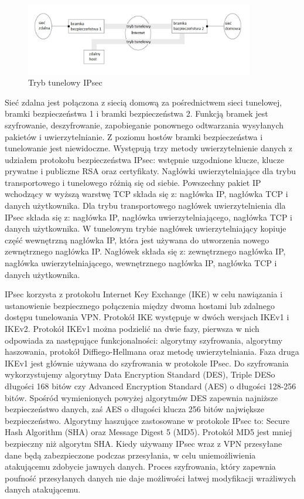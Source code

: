 \documentclass[12p]{article}
\begin{document}
\begin{figure}[h]
\centering
\includegraphics[width=10cm]{tryb_tunelowy_IPsec.jpg}
\caption{Tryb tunelowy IPsec}\label{IPsec}
\end{figure}
 
\quad Sieć zdalna jest połączona z siecią domową za pośrednictwem sieci tunelowej, bramki bezpieczeństwa 1 i bramki bezpieczeństwa 2. Funkcją bramek jest szyfrowanie, deszyfrowanie, zapobieganie ponownego odtwarzania wysyłanych pakietów i uwierzytelnianie. Z poziomu hostów bramki bezpieczeństwa i tunelowanie jest niewidoczne. Występują trzy metody uwierzytelnienie danych z udziałem protokołu bezpieczeństwa IPsec: wstępnie uzgodnione klucze, klucze prywatne i publiczne RSA oraz certyfikaty. Nagłówki uwierzytelniające dla trybu transportowego i tunelowego różnią się od siebie. Powszechny pakiet IP wchodzący w wyższą warstwę TCP składa się z: nagłówka IP, nagłówka TCP i danych użytkownika. Dla trybu transportowego nagłówek uwierzytelnienia dla IPsec składa się z: nagłówka IP, nagłówka uwierzytelniającego, nagłówka TCP i danych użytkownika. W tunelowym trybie nagłówek uwierzytelniający kopiuje część wewnętrzną nagłówka IP, która jest używana do utworzenia nowego zewnętrznego nagłówka IP. Nagłówek składa się z: zewnętrznego nagłówka IP, nagłówka uwierzytelniającego, wewnętrznego nagłówka IP, nagłówka TCP i danych użytkownika.

IPsec korzysta z protokołu Internet Key Exchange (IKE) w celu nawiązania i ustanowienie bezpiecznego połączenia między dwoma hostami lub zdalnego dostępu tunelowania VPN. Protokół IKE występuje w dwóch wersjach IKEv1 i IKEv2. Protokół IKEv1 można podzielić na dwie fazy, pierwsza w nich odpowiada za następujące funkcjonalności: algorytmy szyfrowania, algorytmy haszowania, protokół Diffiego-Hellmana oraz metodę uwierzytelniania.  Faza druga IKEv1 jest głównie używana do szyfrowania w protokole IPsec. Do szyfrowania wykorzystujemy algorytmy Data Encryption Standard (DES),  Triple DESo długości 168 bitów czy Advanced Encryption Standard (AES) o długości 128-256 bitów. Spośród wymienionych powyżej algorytmów DES zapewnia najniższe bezpieczeństwo danych, zaś AES o długości klucza 256 bitów największe bezpieczeństwo. Algorytmy haszujące zastosowane w protokole IPsec to: Secure Hash Algorithm (SHA) oraz Message Digest 5 (MD5). Protokół MD5 jest mniej bezpieczny niż algorytm SHA.
Kiedy używamy IPsec wraz z VPN przesyłane dane będą zabezpieczone podczas przesyłania, w celu uniemożliwienia atakującemu zdobycie jawnych danych.  Proces szyfrowania, który zapewnia poufność przesyłanych danych nie daje możliwości łatwej modyfikacji wrażliwych danych atakującemu.
\end{document}
